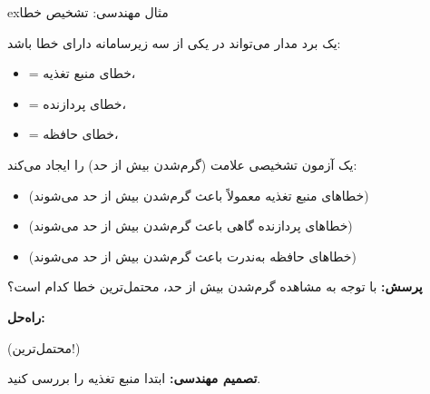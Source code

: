 \begin{PSbox}[unbreakable]{ex}{مثال مهندسی: تشخیص خطا}

یک برد مدار می‌تواند در یکی از سه زیرسامانه دارای خطا باشد:

\begin{itemize}
\tightlist
\item
   = خطای منبع تغذیه، 
\item
   = خطای پردازنده، 
\item
   = خطای حافظه، 
\end{itemize}

یک آزمون تشخیصی علامت  (گرم‌شدن بیش از حد) را ایجاد می‌کند:

\begin{itemize}
\tightlist
\item
   (خطاهای منبع تغذیه معمولاً باعث گرم‌شدن بیش از حد می‌شوند)
\item
   (خطاهای پردازنده گاهی باعث گرم‌شدن بیش از حد می‌شوند)
\item
   (خطاهای حافظه به‌ندرت باعث گرم‌شدن بیش از حد می‌شوند)
\end{itemize}

\textbf{پرسش:} با توجه به مشاهده گرم‌شدن بیش از حد، محتمل‌ترین خطا کدام است؟

\textbf{راه‌حل:}

\PSbr{}\PSbr{}

 (محتمل‌ترین!)\PSbr{}\PSbr{}

\textbf{تصمیم مهندسی:} ابتدا منبع تغذیه را بررسی کنید.

\end{PSbox}

